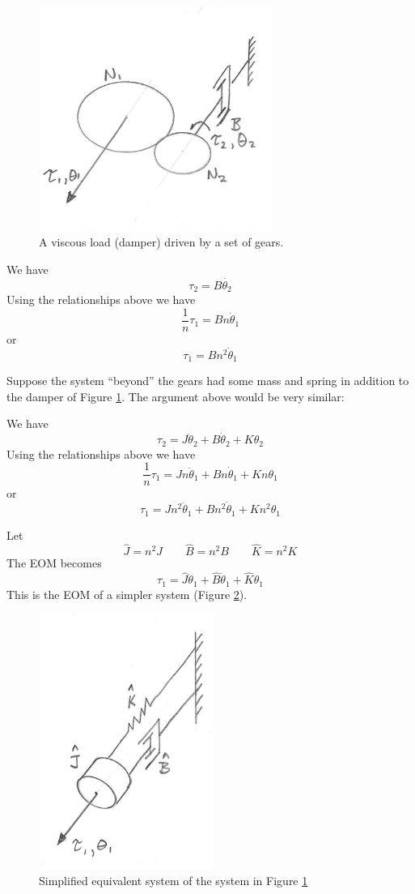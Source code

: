 \begin{figure}\centering
\includegraphics[width=3.0in]{figs03/00745a.png}
\caption{A viscous load (damper) driven by a set of gears.}\label{dampergears}
\end{figure}

We have
\[
\tau_2 = B \dot{\theta_2}
\]
Using the relationships above we have
\[
\frac{1}{n}\tau_1 = Bn\dot{\theta}_1
\]
or
\[
\tau_1 = Bn^2\dot{\theta}_1
\]

Suppose the system ``beyond'' the gears had some mass and spring in addition to the damper of Figure \ref{dampergears}. The argument above would be very similar:

We have
\[
\tau_2 = J \ddot{\theta}_2 + B \dot{\theta}_2 + K \theta_2
\]
Using the relationships above we have
\[
\frac{1}{n}\tau_1 =J n \ddot{\theta}_1 + B n\dot{\theta}_1 + K n\theta_1
\]
or
\[
\tau_1 =J n^2 \ddot{\theta}_1 + B n^2\dot{\theta}_1 + K n^2\theta_1
\]

Let
\[
\hat{J} = n^2J \qquad \hat{B} = n^2B \qquad \hat{K} = n^2 K
\]
The EOM becomes
\[
\tau_1 =\hat{J}\ddot{\theta}_1 + \hat{B} \dot{\theta}_1 + \hat{K} \theta_1
\]
This is the EOM of a simpler system (Figure \ref{simplifiedgearsys}).



\begin{figure}\centering
  \includegraphics[width=2.25in]{figs03/00746a.png}
  \caption{Simplified equivalent system of the system in Figure \ref{dampergears}}\label{simplifiedgearsys}
\end{figure}





